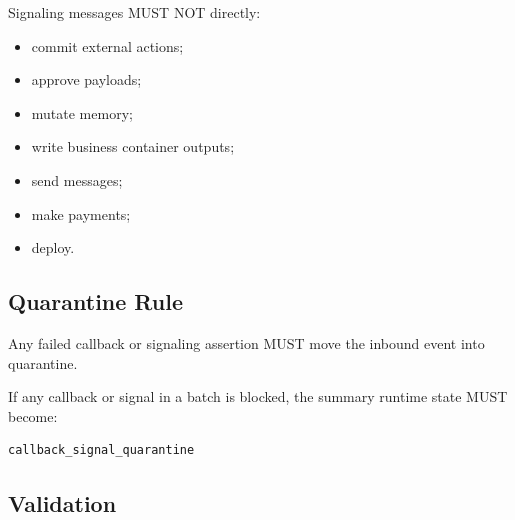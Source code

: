 Signaling messages MUST NOT directly:

\begin{itemize}
  \item commit external actions;
  \item approve payloads;
  \item mutate memory;
  \item write business container outputs;
  \item send messages;
  \item make payments;
  \item deploy.
\end{itemize}

\subsection{Quarantine Rule}

Any failed callback or signaling assertion MUST move the inbound event into quarantine.

If any callback or signal in a batch is blocked, the summary runtime state MUST become:

\begin{verbatim}
callback_signal_quarantine
\end{verbatim}

\subsection{Validation}

